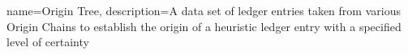 \documentclass{article}
\begin{document}
{
    name={Origin Tree},
    description={A data set of ledger entries taken from various Origin Chains to establish the origin of a heuristic ledger entry with a specified level of certainty}
}




\printglossaries

\end{document}
